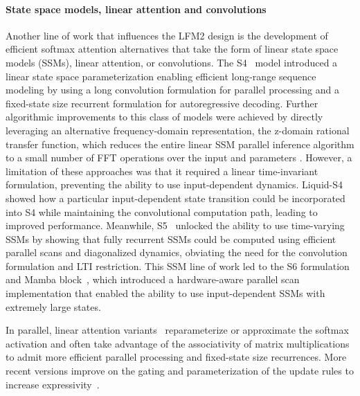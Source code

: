\documentclass{article}
\begin{document}
\paragraph{State space models, linear attention and convolutions}
Another line of work that influences the LFM2 design is the development of efficient softmax attention alternatives that take the form of linear state space models (SSMs), linear attention, or convolutions.  The S4~\citep{gu2022efficiently} model introduced a linear state space parameterization enabling efficient long-range sequence modeling by using a long convolution formulation for parallel processing and a fixed-state size recurrent formulation for autoregressive decoding. 
Further algorithmic improvements to this class of models were achieved by directly leveraging an alternative frequency-domain representation, the z-domain rational transfer function, which reduces the entire linear SSM parallel inference algorithm to a small number of FFT operations over the input and parameters \citep{parnichkun2024state}.
However, a limitation of these approaches was that it required a linear time-invariant formulation, preventing the ability to use input-dependent dynamics.  Liquid-S4~\citep{hasani2023liquid} showed how a particular input-dependent state transition could be incorporated into S4 while maintaining the convolutional computation path, leading to improved performance. Meanwhile, S5~\citep{smith2023simplified, smith2023convolutional} unlocked the ability to use time-varying SSMs by showing that fully recurrent SSMs could be computed using efficient parallel scans and diagonalized dynamics, obviating the need for the convolution formulation and LTI restriction. This SSM line of work led to the S6 formulation and Mamba block~\citep{gu2024mamba}, which introduced a hardware-aware parallel scan implementation that enabled the ability to use input-dependent SSMs with extremely large states. 

In parallel, linear attention variants~\citep{katharopoulos2020transformers, choromanski2021rethinking} reparameterize or approximate the softmax activation and often take advantage of the associativity of matrix multiplications to admit more efficient parallel processing and fixed-state size recurrences.  More recent versions improve on the gating and parameterization of the update rules to increase expressivity~\citep{yang2024gated, dao2024transformers, yang2024parallelizing, yang2025gated}.
\end{document}
